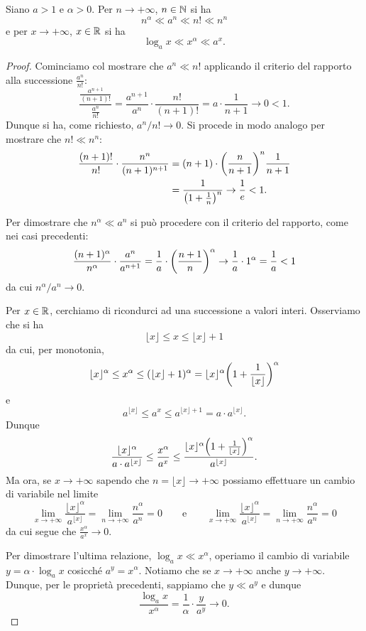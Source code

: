 \begin{theorem}
\label{th:ordine_infinito}%
%
\mymark{***}%
Siano $a>1$ e $\alpha>0$. Per $n\to +\infty$, $n\in\mathbb N$
si ha
\[
  n^\alpha \ll a^n \ll n! \ll n^n
\]
e per $x\to +\infty$, $x\in \mathbb R$ si ha 
\[
\log_a x \ll x^\alpha \ll a^x.
\]
\end{theorem}
%
\begin{proof}
\mymark{**}
Cominciamo col mostrare che $a^n \ll n!$
applicando il criterio del rapporto alla successione $\frac{a^n}{n!}$:
\[
\frac{\displaystyle \frac{a^{n+1}}{(n+1)!}}{\displaystyle \frac{a^n}{n!}}
= \frac{a^{n+1}}{a^n}\cdot \frac{n!}{(n+1)!}
= a \cdot \frac {1}{n + 1} \to 0 < 1.
\]
Dunque si ha, come richiesto, $a^n / n! \to 0$.
Si procede in modo analogo per mostrare che $n! \ll n^n$:
\begin{align*}
\frac{(n+1)!}{n!}\cdot \frac{n^n}{(n+1)^{n+1}}
&= (n+1) \cdot {\left( \frac{n}{n+1} \right)}^n \frac {1}{n+1}\\
&= \frac{1}{{\left( 1+\frac 1 n \right)}^n} \to \frac 1 e < 1.
\end{align*}

Per dimostrare che
$n^\alpha \ll a^n$
si può procedere con il criterio del rapporto, come nei casi precedenti:
\[
\frac{(n+1)^\alpha}{n^\alpha}\cdot \frac{a^n}{a^{n+1}}
= \frac 1 a \cdot {\left( \frac{n+1}{n} \right)}^\alpha \to \frac 1 a \cdot 1^\alpha = \frac 1 a < 1
\]
da cui $n^\alpha / a^n \to 0$.

Per $x\in \mathbb R$,
cerchiamo di ricondurci ad una successione a valori interi.
Osserviamo che si ha
\[
\lfloor x \rfloor
\le x
\le \lfloor x \rfloor + 1
\]
da cui, per monotonia,
\[
\lfloor x \rfloor^\alpha
\le x^\alpha
\le (\lfloor x \rfloor + 1)^\alpha
= \lfloor x \rfloor^\alpha {\left( 1+ \frac{1}{\lfloor x \rfloor} \right)}^\alpha
\]
e
\[
a^{\lfloor x \rfloor}
\le a^{x}
\le a^{\lfloor x \rfloor + 1}
= a \cdot a^{\lfloor x \rfloor}.
\]
Dunque
\[
\frac{\lfloor x \rfloor^\alpha}{a \cdot a^{\lfloor x \rfloor}}
\le \frac{x^\alpha}{a^{x}}
\le \frac{\lfloor x \rfloor^\alpha {\left( 1+ \frac{1}{\lfloor x \rfloor} \right)}^\alpha}
    {a^{\lfloor x \rfloor}}.
\]
Ma ora, se $x\to +\infty$ sapendo che $n = \lfloor x\rfloor \to +\infty$ 
possiamo effettuare un cambio di variabile nel limite
\[
\lim_{x\to +\infty} \frac{\lfloor x \rfloor^\alpha}{a^{\lfloor x \rfloor}} 
= \lim_{n\to+\infty} \frac{n^\alpha}{a^n} = 0
\qquad
\text{e}
\qquad
\lim_{x\to+\infty} \frac{\lfloor x \rfloor^\alpha }
    {a^{\lfloor x \rfloor}} 
= \lim_{n\to+\infty} \frac{n^\alpha}{a^n} = 0
\]
da cui segue che $\frac{x^\alpha}{a^{x}}\to 0$.

Per dimostrare l'ultima relazione, $\log_a x\ll x^\alpha$,
operiamo il cambio di variabile $y = \alpha \cdot \log_a x$
cosicché $a^y = x^\alpha$.
Notiamo che se $x\to +\infty$
anche $y \to +\infty$.
Dunque, per le proprietà precedenti,
sappiamo che $y \ll a^y$ e dunque
\[
\frac{\log_a x}{x^\alpha}
= \frac{1}{\alpha}\cdot\frac{y}{a^{y}} \to 0.
\]
\end{proof}

